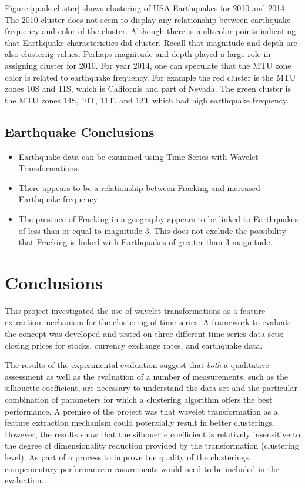 \documentclass{article}
\begin{document}
Figure \ref{quakecluster} shows clustering of USA Earthquakes for 2010 and 2014.  The 2010 cluster does not seem to display any relationship between earthquake frequency and color of the cluster.
Although there is multicolor points indicating that Earthquake characteristics did cluster.  Recall that magnitude and depth are also clusteriig values.  Perhaps magnitude and depth played a large role in assigning cluster for 2010.
For year 2014, one can speculate that the MTU zone color is related to earthquake frequency.  For example the red cluster is the MTU zones 10S and 11S, which is Californis and part of Nevada.
The green cluster is the MTU zones 14S, 10T, 11T, and 12T which had high earthquake frequency.
\subsection{Earthquake Conclusions}

\begin{itemize}
\item Earthquake data can be examined using Time Series with Wavelet Transformations.
\item There appears to be a relationship between Fracking and increased Earthquake frequency.
\item The presence of Fracking in a geography appears to be linked to Earthquakes of less than or equal to  magnitude 3. This does not exclude the possibility that Fracking is linked with Earthquakes of  greater than 3 magnitude.
\end{itemize}


\section{Conclusions}

This project investigated the use of wavelet transformations as a feature extraction mechanism for the clustering of time series. A framework to evaluate the concept was developed and tested on three different time series data sets: closing prices for stocks, currency exchange rates, and earthquake data.

The results of the experimental evaluation suggest that {\em both} a qualitative assessment as well as the evaluation of a number of measurements, such as the silhouette coefficient, are necessary to understand the data set and the particular combination of parameters for which a clustering algorithm offers the best performance. A premise of the project was that wavelet transformation as a feature extraction mechanism could potentially result in better clusterings. However, the results show that the silhouette coefficient is relatively insensitive to the degree of dimensionality reduction provided by the transformation (clustering level). As part of a process to improve tue quality of the clusterings, compementary performance measurements would need to be included in the evaluation.
\end{document}
